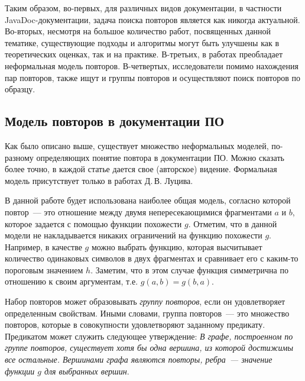 Таким образом, во-первых, для различных видов документации, в частности JavaDoc-документации, задача поиска повторов является  как никогда актуальной.
Во-вторых, несмотря на большое количество работ, посвященных  данной тематике, существующие подходы и алгоритмы могут быть  улучшены как в теоретических оценках, так и на практике.
В-третьих, в работах преобладает неформальная модель повторов.
В-четвертых, исследователи помимо нахождения пар повторов, также ищут и группы повторов и осуществляют поиск повторов по образцу.


\subsection{Модель повторов в документации ПО}\label{Model}
Как было описано выше, существует множество неформальных моделей, по-разному определяющих понятие {повтора} в документации ПО.
Можно сказать более точно, в каждой статье дается свое (авторское) видение.
Формальная модель присутствует только в работах Д.\,В. Луцива.

В данной работе будет использована наиболее общая модель, согласно которой {повтор}~--- это отношение между двумя непересекающимися фрагментами $a$ и $b$, которое задается с помощью функции похожести $g$.
Отметим, что в данной модели не накладывается никаких ограничений на функцию похожести $g$.
Например, в качестве $g$ можно выбрать функцию, которая высчитывает количество одинаковых символов в двух фрагментах и сравнивает его с каким-то пороговым значением $h$. Заметим, что в этом случае функция симметрична по отношению к своим аргументам, т.е. $g(a,b) = g(b,a)$.


Набор {повторов} может образовывать \emph{группу повторов}, если он удовлетворяет определенным свойствам. Иными словами, {группа повторов}~--- это множество повторов, которые в совокупности удовлетворяют заданному предикату.
Предикатом может служить следующее утверждение: \emph{В графе, построенном по группе повторов, существует хотя бы одна вершина, из которой достижимы все остальные. Вершинами графа являются повторы, ребра~--- значение функции $g$  для выбранных вершин}.

